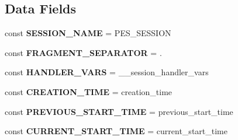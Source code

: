\subsection*{Data Fields}
\begin{DoxyCompactItemize}
\item 
\mbox{\label{class_pes_1_1_session_1_1_session_status_handler_ac15063c1be0036865bc582b411fe04de}} 
const {\bfseries S\+E\+S\+S\+I\+O\+N\+\_\+\+N\+A\+ME} = \textquotesingle{}P\+E\+S\+\_\+\+S\+E\+S\+S\+I\+ON\textquotesingle{}
\item 
\mbox{\label{class_pes_1_1_session_1_1_session_status_handler_a9f1ea8a323c471df2f6438e9081d08ae}} 
const {\bfseries F\+R\+A\+G\+M\+E\+N\+T\+\_\+\+S\+E\+P\+A\+R\+A\+T\+OR} = \textquotesingle{}.\textquotesingle{}
\item 
\mbox{\label{class_pes_1_1_session_1_1_session_status_handler_a1fab1284c87bdbacb4497be1c85e5414}} 
const {\bfseries H\+A\+N\+D\+L\+E\+R\+\_\+\+V\+A\+RS} = \textquotesingle{}\+\_\+\+\_\+session\+\_\+handler\+\_\+vars\textquotesingle{}
\item 
\mbox{\label{class_pes_1_1_session_1_1_session_status_handler_a149075b94804d4b494d65bf197f28c87}} 
const {\bfseries C\+R\+E\+A\+T\+I\+O\+N\+\_\+\+T\+I\+ME} = \textquotesingle{}creation\+\_\+time\textquotesingle{}
\item 
\mbox{\label{class_pes_1_1_session_1_1_session_status_handler_a5912a69ccda99af08ab1425e90ee2307}} 
const {\bfseries P\+R\+E\+V\+I\+O\+U\+S\+\_\+\+S\+T\+A\+R\+T\+\_\+\+T\+I\+ME} = \textquotesingle{}previous\+\_\+start\+\_\+time\textquotesingle{}
\item 
\mbox{\label{class_pes_1_1_session_1_1_session_status_handler_aaf827968ffe1aeea6bafb36d8e72a40e}} 
const {\bfseries C\+U\+R\+R\+E\+N\+T\+\_\+\+S\+T\+A\+R\+T\+\_\+\+T\+I\+ME} = \textquotesingle{}current\+\_\+start\+\_\+time\textquotesingle{}
\item 
\mbox{\label{class_pes_1_1_session_1_1_session_status_handler_a8dbc36b4e10d14fc0f40a11312fedc79}} 

\end{DoxyCompactItemize}
